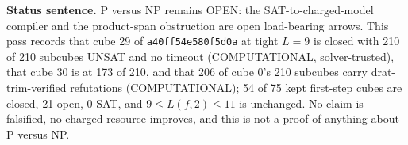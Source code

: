 \documentclass[11pt]{article}
\begin{document}
\bigskip
\noindent\textbf{Status sentence.} P versus NP remains OPEN: the SAT-to-charged-model compiler and the product-span obstruction are open load-bearing arrows. This pass records that cube 29 of \texttt{a40ff54e580f5d0a} at tight $L=9$ is closed with 210 of 210 subcubes UNSAT and no timeout (COMPUTATIONAL, solver-trusted), that cube 30 is at 173 of 210, and that 206 of cube 0's 210 subcubes carry drat-trim-verified refutations (COMPUTATIONAL); 54 of 75 kept first-step cubes are closed, 21 open, 0 SAT, and $9\le L(f,2)\le 11$ is unchanged. No claim is falsified, no charged resource improves, and this is not a proof of anything about P versus NP.
\end{document}
